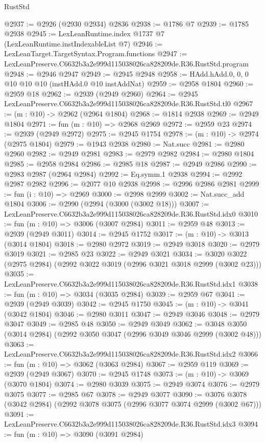 \begin{lexlean}{RustStd}
\begin{coremodule}
@2937 := @2926 (@2930 @2934) @2836
@2938 := @1786 @7
@2939 := @1785 @2938
@2945 := LexLeanRuntime.index @1737 @7 (LexLeanRuntime.instIndexableList @7)
@2946 := LexLeanTarget.TargetSyntax.Program.functions
@2947 := LexLeanPreserve.C6632b3a2e999d115038026ca828209de.R36.RustStd.program
@2948 := @2946 @2947
@2949 := @2945 @2948
@2958 := HAdd.hAdd.{0, 0, 0} @10 @10 @10 (instHAdd.{0} @10 instAddNat)
@2959 := @2958 @1804
@2960 := @2959 @18
@2962 := @2939 (@2949 @2960)
@2964 := @2945 LexLeanPreserve.C6632b3a2e999d115038026ca828209de.R36.RustStd.tl0
@2967 := (m : @10) -> @2962 (@2964 @1804)
@2968 := @1814 @2938
@2969 := @2949 @1804
@2971 := fun (m : @10) => @2968 @2969
@2972 := @2959 @23
@2974 := @2939 (@2949 @2972)
@2975 := @2945 @1754
@2978 := (m : @10) -> @2974 (@2975 @1804)
@2979 := @1943 @2938
@2980 := Nat.succ
@2981 := @2980 @2960
@2982 := @2949 @2981
@2983 := @2979 @2982
@2984 := @2980 @1804
@2985 := @2958 @2984
@2986 := @2985 @18
@2987 := @2949 @2986
@2990 := @2983 @2987 (@2964 @2984)
@2992 := Eq.symm.{1} @2938
@2994 := @2992 @2987 @2982
@2996 := @2077 @10 @2938
@2998 := @2996 @2986 @2981
@2999 := fun (i : @10) => @2969
@3000 := @2998 @2999
@3002 := Nat.succ_add @1804
@3006 := @2990 (@2994 (@3000 (@3002 @18)))
@3007 := LexLeanPreserve.C6632b3a2e999d115038026ca828209de.R36.RustStd.idx0
@3010 := fun (m : @10) => @3006 (@3007 @2984)
@3011 := @2959 @48
@3013 := @2939 (@2949 @3011)
@3014 := @2945 @1752
@3017 := (m : @10) -> @3013 (@3014 @1804)
@3018 := @2980 @2972
@3019 := @2949 @3018
@3020 := @2979 @3019
@3021 := @2985 @23
@3022 := @2949 @3021
@3034 := @3020 @3022 (@2975 @2984) (@2992 @3022 @3019 (@2996 @3021 @3018 @2999 (@3002 @23)))
@3035 := LexLeanPreserve.C6632b3a2e999d115038026ca828209de.R36.RustStd.idx1
@3038 := fun (m : @10) => @3034 (@3035 @2984)
@3039 := @2959 @67
@3041 := @2939 (@2949 @3039)
@3042 := @2945 @1750
@3045 := (m : @10) -> @3041 (@3042 @1804)
@3046 := @2980 @3011
@3047 := @2949 @3046
@3048 := @2979 @3047
@3049 := @2985 @48
@3050 := @2949 @3049
@3062 := @3048 @3050 (@3014 @2984) (@2992 @3050 @3047 (@2996 @3049 @3046 @2999 (@3002 @48)))
@3063 := LexLeanPreserve.C6632b3a2e999d115038026ca828209de.R36.RustStd.idx2
@3066 := fun (m : @10) => @3062 (@3063 @2984)
@3067 := @2959 @119
@3069 := @2939 (@2949 @3067)
@3070 := @2945 @1748
@3073 := (m : @10) -> @3069 (@3070 @1804)
@3074 := @2980 @3039
@3075 := @2949 @3074
@3076 := @2979 @3075
@3077 := @2985 @67
@3078 := @2949 @3077
@3090 := @3076 @3078 (@3042 @2984) (@2992 @3078 @3075 (@2996 @3077 @3074 @2999 (@3002 @67)))
@3091 := LexLeanPreserve.C6632b3a2e999d115038026ca828209de.R36.RustStd.idx3
@3094 := fun (m : @10) => @3090 (@3091 @2984)

\end{coremodule}
\end{lexlean}
